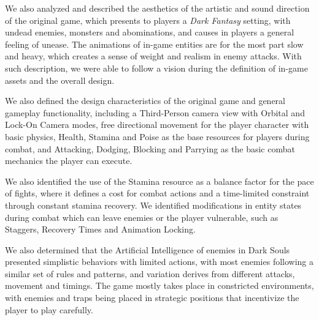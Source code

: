 We also analyzed and described the aesthetics of the artistic and sound direction of the original game, which presents to players a \emph{Dark Fantasy} setting, with undead enemies, monsters and abominations, and causes in players a general feeling of unease. The animations of in-game entities are for the most part slow and heavy, which creates a sense of weight and realism in enemy attacks. With such description, we were able to follow a vision during the definition of in-game assets and the overall design.

We also defined the design characteristics of the original game and general gameplay functionality, including a Third-Person camera view with Orbital and Lock-On Camera modes, free directional movement for the player character with basic physics, Health, Stamina and Poise as the base resources for players during combat, and Attacking, Dodging, Blocking and Parrying as the basic combat mechanics the player can execute.

We also identified the use of the Stamina resource as a balance factor for the pace of fights, where it defines a cost for combat actions and a time-limited constraint through constant stamina recovery. We identified modifications in entity states during combat which can leave enemies or the player vulnerable, such as Staggers, Recovery Times and Animation Locking.

We also determined that the Artificial Intelligence of enemies in Dark Souls presented simplistic behaviors with limited actions, with most enemies following a similar set of rules and patterns, and variation derives from different attacks, movement and timings. The game mostly takes place in constricted environments, with enemies and traps being placed in strategic positions that incentivize the player to play carefully. 

